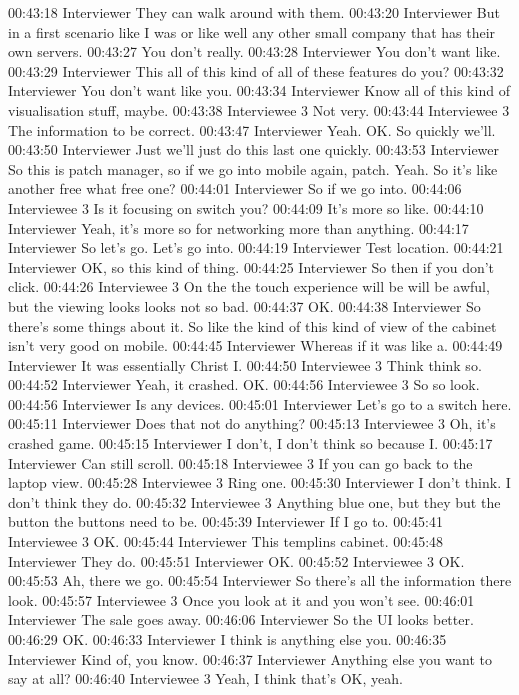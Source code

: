 00:43:18 Interviewer
They can walk around with them.
00:43:20 Interviewer
But in a first scenario like I was or like well any other small company that has their own servers.
00:43:27
You don't really.
00:43:28 Interviewer
You don't want like.
00:43:29 Interviewer
This all of this kind of all of these features do you?
00:43:32 Interviewer
You don't want like you.
00:43:34 Interviewer
Know all of this kind of visualisation stuff, maybe.
00:43:38 Interviewee 3
Not very.
00:43:44 Interviewee 3
The information to be correct.
00:43:47 Interviewer
Yeah. OK. So quickly we'll.
00:43:50 Interviewer
Just we'll just do this last one quickly.
00:43:53 Interviewer
So this is patch manager, so if we go into mobile again, patch. Yeah. So it's like another free what free one?
00:44:01 Interviewer
So if we go into.
00:44:06 Interviewee 3
Is it focusing on switch you?
00:44:09
It's more so like.
00:44:10 Interviewer
Yeah, it's more so for networking more than anything.
00:44:17 Interviewer
So let's go. Let's go into.
00:44:19 Interviewer
Test location.
00:44:21 Interviewer
OK, so this kind of thing.
00:44:25 Interviewer
So then if you don't click.
00:44:26 Interviewee 3
On the the touch experience will be will be awful, but the viewing looks looks not so bad.
00:44:37
OK.
00:44:38 Interviewer
So there's some things about it. So like the kind of this kind of view of the cabinet isn't very good on mobile.
00:44:45 Interviewer
Whereas if it was like a.
00:44:49 Interviewer
It was essentially Christ I.
00:44:50 Interviewee 3
Think think so.
00:44:52 Interviewer
Yeah, it crashed. OK.
00:44:56 Interviewee 3
So so look.
00:44:56 Interviewer
Is any devices.
00:45:01 Interviewer
Let's go to a switch here.
00:45:11 Interviewer
Does that not do anything?
00:45:13 Interviewee 3
Oh, it's crashed game.
00:45:15 Interviewer
I don't, I don't think so because I.
00:45:17 Interviewer
Can still scroll.
00:45:18 Interviewee 3
If you can go back to the laptop view.
00:45:28 Interviewee 3
Ring one.
00:45:30 Interviewer
I don't think. I don't think they do.
00:45:32 Interviewee 3
Anything blue one, but they but the button the buttons need to be.
00:45:39 Interviewer
If I go to.
00:45:41 Interviewee 3
OK.
00:45:44 Interviewer
This templins cabinet.
00:45:48 Interviewer
They do.
00:45:51 Interviewer
OK.
00:45:52 Interviewee 3
OK.
00:45:53
Ah, there we go.
00:45:54 Interviewer
So there's all the information there look.
00:45:57 Interviewee 3
Once you look at it and you won't see.
00:46:01 Interviewer
The sale goes away.
00:46:06 Interviewer
So the UI looks better.
00:46:29
OK.
00:46:33 Interviewer
I think is anything else you.
00:46:35 Interviewer
Kind of, you know.
00:46:37 Interviewer
Anything else you want to say at all?
00:46:40 Interviewee 3
Yeah, I think that's OK, yeah.
